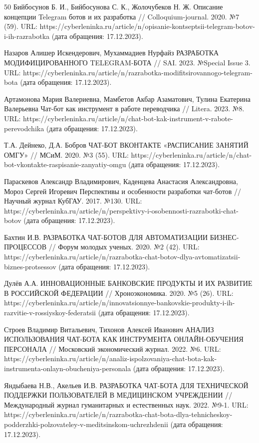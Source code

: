 \documentclass{article}
\begin{document}
\begin{thebibliography} {50}
Бийбосунов Б. И., Бийбосунова С. К., Жолочубеков Н. Ж. Описание концепции Telegram ботов и их разработка // Colloquium-journal. 2020. №7 (59). URL: https://cyberleninka.ru/article/n/opisanie-kontseptsii-telegram-botov-i-ih-razrabotka (дата обращения: 17.12.2023).

Назаров Алишер Искендерович, Мухаммадиев Нурфайз РАЗРАБОТКА МОДИФИЦИРОВАННОГО TELEGRAM-БОТА // SAI. 2023. №Special Issue 3. URL: https://cyberleninka.ru/article/n/razrabotka-modifitsirovannogo-telegram-bota (дата обращения: 17.12.2023).

Артамонова Мария Валериевна, Мамбетов Акбар Азаматович, Тулина Екатерина Валерьевна Чат-бот как инструмент в работе переводчика // Litera. 2023. №8. URL: https://cyberleninka.ru/article/n/chat-bot-kak-instrument-v-rabote-perevodchika (дата обращения: 17.12.2023).

Т.А. Дейнеко, Д.А. Бобров ЧАТ-БОТ ВКОНТАКТЕ «РАСПИСАНИЕ ЗАНЯТИЙ ОМГУ» // МСиМ. 2020. №3 (55). URL: https://cyberleninka.ru/article/n/chat-bot-vkontakte-raspisanie-zanyatiy-omgu (дата обращения: 17.12.2023).

Параскевов Александр Владимирович, Каденцева Анастасия Александровна, Мороз Сергей Игоревич Перспективы и особенности разработки чат-ботов // Научный журнал КубГАУ. 2017. №130. URL: https://cyberleninka.ru/article/n/perspektivy-i-osobennosti-razrabotki-chat-botov (дата обращения: 17.12.2023).

Бахтин И.В. РАЗРАБОТКА ЧАТ-БОТОВ ДЛЯ АВТОМАТИЗАЦИИ БИЗНЕС- ПРОЦЕССОВ // Форум молодых ученых. 2020. №2 (42). URL: https://cyberleninka.ru/article/n/razrabotka-chat-botov-dlya-avtomatizatsii-biznes-protsessov (дата обращения: 17.12.2023).

Дулёв А.А. ИННОВАЦИОННЫЕ БАНКОВСКИЕ ПРОДУКТЫ И ИХ РАЗВИТИЕ В РОССИЙСКОЙ ФЕДЕРАЦИИ // Хроноэкономика. 2020. №5 (26). URL: https://cyberleninka.ru/article/n/innovatsionnye-bankovskie-produkty-i-ih-razvitie-v-rossiyskoy-federatsii (дата обращения: 17.12.2023).

Строев Владимир Витальевич, Тихонов Алексей Иванович АНАЛИЗ ИСПОЛЬЗОВАНИЯ ЧАТ-БОТА КАК ИНСТРУМЕНТА ОНЛАЙН-ОБУЧЕНИЯ ПЕРСОНАЛА // Московский экономический журнал. 2022. №6. URL: https://cyberleninka.ru/article/n/analiz-ispolzovaniya-chat-bota-kak-instrumenta-onlayn-obucheniya-personala (дата обращения: 17.12.2023).

Яндыбаева Н.В., Акельев И.В. РАЗРАБОТКА ЧАТ-БОТА ДЛЯ ТЕХНИЧЕСКОЙ ПОДДЕРЖКИ ПОЛЬЗОВАТЕЛЕЙ В МЕДИЦИНСКОМ УЧРЕЖДЕНИИ // Международный журнал гуманитарных и естественных наук. 2022. №9-1. URL: https://cyberleninka.ru/article/n/razrabotka-chat-bota-dlya-tehnicheskoy-podderzhki-polzovateley-v-meditsinskom-uchrezhdenii (дата обращения: 17.12.2023).


\end{thebibliography}
\end{document}
